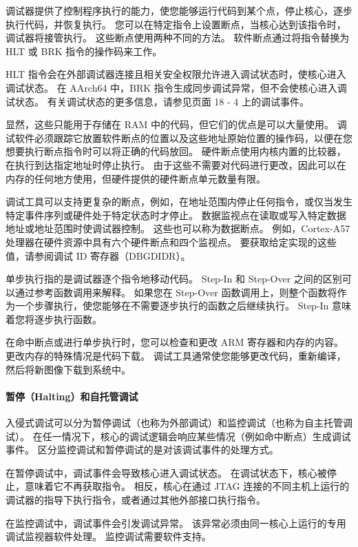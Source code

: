 调试器提供了控制程序执行的能力，使您能够运行代码到某个点，停止核心，逐步执行代码，并恢复执行。
您可以在特定指令上设置断点，当核心达到该指令时，调试器将接管执行。
这些断点使用两种不同的方法。
软件断点通过将指令替换为 HLT 或 BRK 指令的操作码来工作。

HLT 指令会在外部调试器连接且相关安全权限允许进入调试状态时，使核心进入调试状态。
在 AArch64 中，BRK 指令生成同步调试异常，但不会使核心进入调试状态。
有关调试状态的更多信息，请参见页面 18 - 4 上的调试事件。

显然，这些只能用于存储在 RAM 中的代码，但它们的优点是可以大量使用。
调试软件必须跟踪它放置软件断点的位置以及这些地址原始位置的操作码，以便在您想要执行断点指令时可以将正确的代码放回。
硬件断点使用内核内置的比较器，在执行到达指定地址时停止执行。
由于这些不需要对代码进行更改，因此可以在内存的任何地方使用，但硬件提供的硬件断点单元数量有限。

调试工具可以支持更复杂的断点，例如，在地址范围内停止任何指令，或仅当发生特定事件序列或硬件处于特定状态时才停止。
数据监视点在读取或写入特定数据地址或地址范围时使调试器控制。
这些也可以称为数据断点。
例如，Cortex-A57 处理器在硬件资源中具有六个硬件断点和四个监视点。
要获取给定实现的这些值，请参阅调试 ID 寄存器（DBGDIDR）。

单步执行指的是调试器逐个指令地移动代码。
Step-In 和 Step-Over 之间的区别可以通过参考函数调用来解释。
如果您在 Step-Over 函数调用上，则整个函数将作为一个步骤执行，使您能够在不需要逐步执行的函数之后继续执行。
Step-In 意味着您将逐步执行函数。

在命中断点或进行单步执行时，您可以检查和更改 ARM 寄存器和内存的内容。
更改内存的特殊情况是代码下载。
调试工具通常使您能够更改代码，重新编译，然后将新图像下载到系统中。

\paragraph*{暂停（Halting）和自托管调试}

入侵式调试可以分为暂停调试（也称为外部调试）和监控调试（也称为自主托管调试）。
在任一情况下，核心的调试逻辑会响应某些情况（例如命中断点）生成调试事件。
区分监控调试和暂停调试的是对该调试事件的处理方式。

在暂停调试中，调试事件会导致核心进入调试状态。
在调试状态下，核心被停止，意味着它不再获取指令。
相反，核心在通过 JTAG 连接的不同主机上运行的调试器的指导下执行指令，或者通过其他外部接口执行指令。

在监控调试中，调试事件会引发调试异常。
该异常必须由同一核心上运行的专用调试监视器软件处理。
监控调试需要软件支持。

